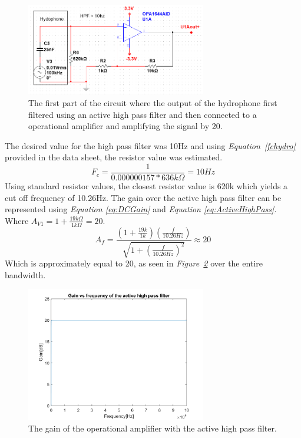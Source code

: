 \begin{figure}[h]
    \centering
    \includegraphics[width=0.70\textwidth]{graphics/OPamp1.png}
    \caption{The first part of the circuit where the output of the hydrophone first filtered using an active high pass filter and then connected to a operational amplifier and amplifying the signal by 20.}
    \label{fig:Opamp1}
\end{figure}


The desired value for the high pass filter was 10Hz and using \textit{Equation~\ref{fchydro}} provided in the data sheet, the resistor value was estimated.   
$$F_c = \frac{1}{0.000000157 * 636k\Omega} = 10Hz$$
Using standard resistor values, the closest resistor value is 620k which yields a cut off frequency of 10.26Hz.
The gain over the active high pass filter can be represented using \textit{Equation \ref{eq:DCGain}} and \textit{Equation \ref{eq:ActiveHighPass}}. 
Where $A_{V1} = 1 + \frac{19k\Omega}{1k\Omega} = 20$.
$$A_f = \frac{(1+\frac{19k}{1k})(\frac{f}{10.26Hz})}{\sqrt{1 + (\frac{f}{10.26Hz})^2}} \approx 20$$
Which is approximately equal to 20, as seen in \textit{Figure~\ref{fig:AVhighpass}} over the entire bandwidth.

\begin{figure}[h]
    \centering
    \includegraphics[width=0.7\textwidth]{graphics/Av_Highpass.png}
    \caption{The gain of the operational amplifier with the active high pass filter.}
    \label{fig:AVhighpass}
\end{figure}

